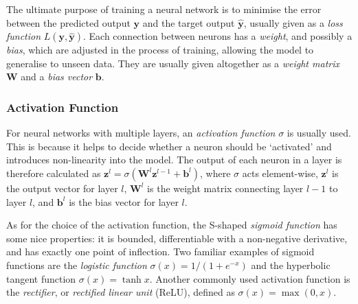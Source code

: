 \documentclass[a4paper,11pt, titlepage]{article}
\theoremstyle{definition}
\theoremstyle{plain}
\theoremstyle{remark}
\begin{document}
The ultimate purpose of training a neural network is to minimise the error between the predicted output $\mathbf{y}$ and the target output $\mathbf{\hat{y}}$, usually given as a \textit{loss function} $L(\mathbf{y}, \mathbf{\hat{y}})$. Each connection between neurons has a \textit{weight}, and possibly a \textit{bias}, which are adjusted in the process of training, allowing the model to generalise to unseen data. They are usually given altogether as a \textit{weight matrix} $\mathbf{W}$ and a \textit{bias vector} $\mathbf{b}$.

\subsubsection{Activation Function}

For neural networks with multiple layers, an \textit{activation function} $\sigma$ is usually used. This is because it helps to decide whether a neuron should be ‘activated’ and introduces non-linearity into the model. The output of each neuron in a layer is therefore calculated as $\mathbf{z}^l=\sigma\left(\mathbf{W}^l\mathbf{z}^{l-1}+\mathbf{b}^l\right)$, where $\sigma$ acts element-wise, $\mathbf{z}^l$ is the output vector for layer $l$, $\mathbf{W}^l$ is the weight matrix connecting layer $l-1$ to layer $l$, and $\mathbf{b}^l$ is the bias vector for layer $l$. 

As for the choice of the activation function, the S-shaped \textit{sigmoid function} has some nice properties: it is bounded, differentiable with a non-negative derivative, and has exactly one point of inflection. Two familiar examples of sigmoid functions are the \textit{logistic function} $\sigma(x)=1/\left(1+e^{-x}\right)$ and the hyperbolic tangent function $\sigma(x)=\tanh x$. Another commonly used activation function is the \textit{rectifier}, or \textit{rectified linear unit} (ReLU), defined as $\sigma(x)=\max(0, x)$.
\end{document}
